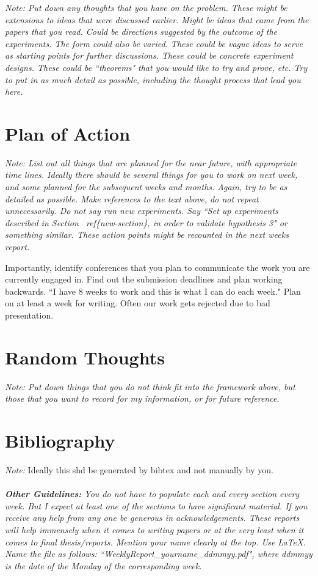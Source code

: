 \documentclass{article}[11pt]
\begin{document}
{\it Note: Put down any thoughts that you have on the problem. These might
be extensions to ideas that were discussed earlier. Might be ideas that came
from the papers that you read. Could be directions suggested by the outcome
of the experiments. The form could also be varied. These could be vague
ideas to serve as starting points for further discussions. These could be
concrete experiment designs. These could be ``theorems" that you would like
to try and prove, etc. Try to put in as much detail as possible, including
the thought process that lead you here. }

\section{Plan of Action}
{\it Note: List out all things that are planned for the near future, with
appropriate time lines. Ideally there should be several things for you to
work on next week, and some planned for the subsequent weeks and months.
Again, try to be as detailed as possible. Make references to the text above,
do not repeat unnecessarily. Do not say run new experiments. Say ``Set up
experiments described in Section \ ref\{new-section\}, in order to validate
hypothesis 3" or something similar. These action points might be recounted
in the next weeks report. 

Importantly, identify conferences that you plan to communicate the work you
are currently engaged in. Find out the submission deadlines and plan working
backwards. ``I have 8 weeks to work and this is what I can do each week." Plan
on at least a week for writing. Often our work gets rejected due to bad
presentation.}

\section{Random Thoughts}
{\it Note: Put down things that you do not think fit into the framework
above, but those that you want to record for my information, or for future
reference. }

\section{Bibliography}
{\it Note:} Ideally this shd be generated by bibtex and not manually by
you.\\
 \\

{\it {\bf Other Guidelines:} You do not have to populate each and every section
every week. But I expect at least one of the sections to have significant
material. If you receive any help from any one be generous in
acknowledgements. These reports will help immensely when it comes to writing
papers or at the very least when it comes to final thesis/reports. Mention
your name clearly at the top. Use LaTeX. Name the file as follows:
``WeeklyReport\_yourname\_ddmmyy.pdf", where ddmmyy is the date of the Monday
of the corresponding week.}
\end{document}
